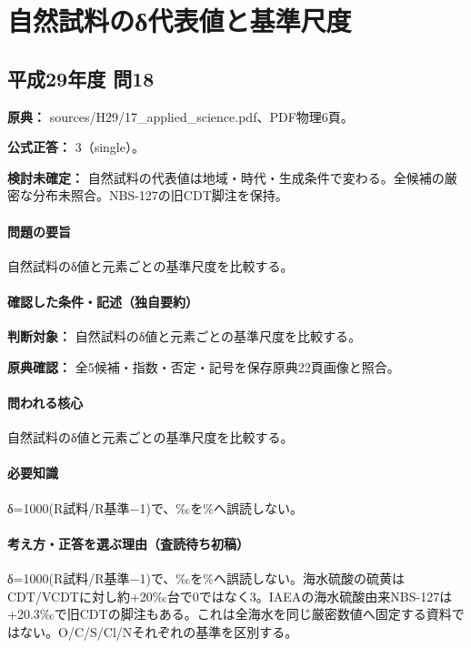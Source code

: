 \section{自然試料のδ代表値と基準尺度}

\subsection{平成29年度 問18}
\label{q:h29-reg-applied-18}

\noindent\textbf{原典：} sources/H29/17\_applied\_science.pdf、PDF物理6頁。

\textbf{公式正答：} 3（single）。

\par\textbf{検討未確定：} 自然試料の代表値は地域・時代・生成条件で変わる。全候補の厳密な分布未照合。NBS-127の旧CDT脚注を保持。

\paragraph{問題の要旨} 自然試料のδ値と元素ごとの基準尺度を比較する。

\paragraph{確認した条件・記述（独自要約）}\mbox{}\par

\noindent\textbf{判断対象：} 自然試料のδ値と元素ごとの基準尺度を比較する。\par

\noindent\textbf{原典確認：} 全5候補・指数・否定・記号を保存原典22頁画像と照合。\par

\paragraph{問われる核心} 自然試料のδ値と元素ごとの基準尺度を比較する。

\paragraph{必要知識} δ=1000(R試料/R基準−1)で、‰を\%へ誤読しない。

\paragraph{考え方・正答を選ぶ理由（査読待ち初稿）} δ=1000(R試料/R基準−1)で、‰を\%へ誤読しない。海水硫酸の硫黄はCDT/VCDTに対し約+20‰台で0ではなく3。IAEAの海水硫酸由来NBS-127は+20.3‰で旧CDTの脚注もある。これは全海水を同じ厳密数値へ固定する資料ではない。O/C/S/Cl/Nそれぞれの基準を区別する。

